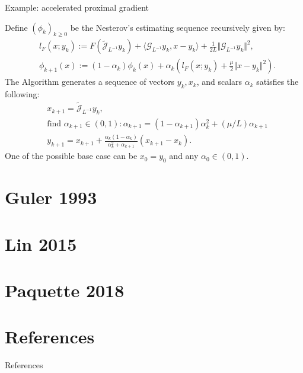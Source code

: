 \documentclass[11pt]{beamer}
\begin{document}
        \begin{frame}{Example: accelerated proximal gradient}
            \begin{definition}
                \label{def:nes-est-seq-pg}
                {\small
                    Define $(\phi_k)_{k \ge0}$ be the Nesterov's estimating sequence recursively given by: 
                    \begin{align*}
                        & l_F(x; y_k) := 
                            F\left(\widetilde{\mathcal J}_{L^{-1}} y_k \right) 
                            + \langle \mathcal G_{L^{-1}}y_k, x - y_k\rangle + 
                        \frac{1}{2L}\Vert \mathcal G_{L^{-1}}y_k\Vert^2, 
                        \\
                        & 
                        \phi_{k + 1}(x)
                        := (1 - \alpha_k)\phi_k (x) + 
                        \alpha_k 
                        \left(
                            l_F(x; y_k) + \frac{\mu}{2}\Vert x - y_k\Vert^2
                        \right). 
                    \end{align*}
                    The Algorithm generates a sequence of vectors $y_k, x_k$, and scalars $\alpha_k$ satisfies the following: 
                    \begin{align*}
                        &x_{k + 1} = \widetilde{\mathcal J}_{L^{-1}} y_k, 
                        \\
                        & \text{find } \alpha_{k + 1} \in (0, 1): 
                        \alpha_{k + 1} = (1 - \alpha_{k + 1})\alpha_k^{2} + (\mu/L) \alpha_{k + 1}
                        \\
                        &y_{k + 1} = x_{k + 1} + \frac{\alpha_k(1 - \alpha_k)}{\alpha_k^2 + \alpha_{k + 1}}(x_{k + 1} - x_k). 
                    \end{align*}
                    One of the possible base case can be $x_0 = y_0$ and any $\alpha_0 \in (0, 1)$. 
                }
            \end{definition}
                
        \end{frame}

\section{Guler 1993}
\section{Lin 2015}
\section{Paquette 2018}
        
    
\section{References}
    \begin{frame}{References}
        
    \end{frame}
\end{document}
